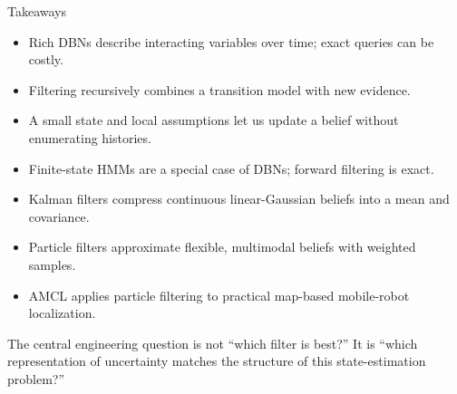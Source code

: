 \documentclass[aspectratio=169,10pt]{beamer}
\begin{document}
\begin{frame}[shrink=10]{Takeaways}
  \begin{itemize}
    \item Rich DBNs describe interacting variables over time; exact queries can be costly.
    \item Filtering recursively combines a transition model with new evidence.
    \item A small state and local assumptions let us update a belief without enumerating histories.
    \item Finite-state HMMs are a special case of DBNs; forward filtering is exact.
    \item Kalman filters compress continuous linear-Gaussian beliefs into a mean and covariance.
    \item Particle filters approximate flexible, multimodal beliefs with weighted samples.
    \item AMCL applies particle filtering to practical map-based mobile-robot localization.
  \end{itemize}

  \begin{keyidea}
    The central engineering question is not ``which filter is best?'' It is ``which representation of uncertainty matches the structure of this state-estimation problem?''
  \end{keyidea}
\end{frame}
\end{document}
